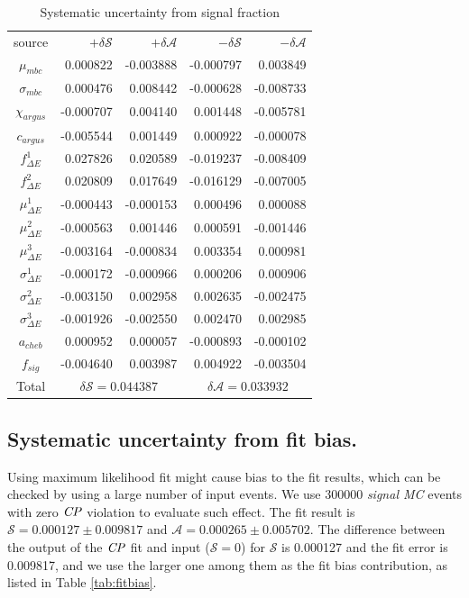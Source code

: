 \begin{table}[htpb]
	\begin{minipage}[b]{1.0\linewidth}
		\centering
		\caption{Systematic uncertainty from  signal fraction}
		\label{tab:sy_fsig}
		\begin{tabular}{c r r r r}
			\hline
			source & $+\delta \mathcal{S}$ & $+\delta \mathcal{A}$ & $-\delta \mathcal{S}$ &  $-\delta \mathcal{A}$\\
			$\mu_{mbc}$  & 0.000822 &	-0.003888&	-0.000797&	0.003849
			\\
			$\sigma_{mbc}$ & 0.000476 &	0.008442&	-0.000628&	-0.008733
			\\
			$\chi_{argus}$ & -0.000707&	0.004140	&0.001448&	-0.005781
			\\
			$c_{argus}$ & -0.005544&	0.001449&	0.000922&	-0.000078\\
			$f^1_{\Delta E}$ & 0.027826 &	0.020589&	-0.019237	&-0.008409
			\\
			$f^2_{\Delta E}$ & 0.020809&	0.017649	&-0.016129	&-0.007005
			\\
			$\mu^1_{\Delta E}$ & -0.000443&	-0.000153&	0.000496&	0.000088\\
				$\mu^2_{\Delta E}$& -0.000563&	0.001446&	0.000591&	-0.001446
			\\
				$\mu^3_{\Delta E}$ & -0.003164&	-0.000834&	0.003354&	0.000981
			\\
				$\sigma^1_{\Delta E}$& -0.000172&	-0.000966&	0.000206&	0.000906
			\\
			$\sigma^2_{\Delta E}$& -0.003150&	0.002958&	0.002635&	-0.002475
			\\
			$\sigma^3_{\Delta E}$& -0.001926&	-0.002550&	0.002470&	0.002985
			\\
			$a_{cheb}$ & 0.000952&	0.000057&	-0.000893&	-0.000102
			\\
			$f_{sig}$ & -0.004640&	0.003987&	0.004922&	-0.003504
			\\
			\hline
			Total &
			\multicolumn{2}{c}{$\delta \mathcal{S}=0.044387$} &
			\multicolumn{2}{c}{$\delta \mathcal{A}=0.033932$}\\
			\hline
		\end{tabular}
	\end{minipage}
\end{table}


\subsection{Systematic uncertainty from fit bias.}
Using maximum likelihood fit might cause bias to the fit results, which can be checked by using a large number of input events. We use 300000 \textit{signal MC}  events with zero $\it{CP}$ violation to evaluate such effect. The fit result is $\mathcal{S} = 0.000127\pm0.009817$ and $\mathcal{A} = 0.000265\pm0.005702$. The difference between the output of the $\it{CP}$ fit and input ($\mathcal{S}=0$) for $\mathcal{S}$ is 0.000127 and the fit error is 0.009817, and we use the larger one among them as the fit bias contribution, as listed in Table \ref{tab:fitbias}.

